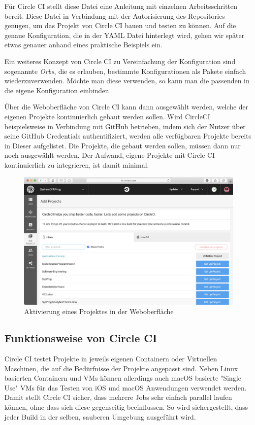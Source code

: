 \documentclass[11pt]{article}
\begin{document}
Für Circle CI stellt diese Datei eine Anleitung mit einzelnen Arbeitsschritten bereit. Diese Datei in Verbindung mit der Autorisierung des Repositories genügen, um das Projekt von Circle CI bauen und testen zu können. Auf die genaue Konfiguration, die in der YAML Datei hinterlegt wird, gehen wir später etwas genauer anhand eines praktische Beispiels ein.

Ein weiteres Konzept von Circle CI zu Vereinfachung der Konfiguration sind sogenannte \textit{Orbs}, die es erlauben, bestimmte Konfigurationen als Pakete einfach wiederzuverwenden. Möchte man diese verwenden, so kann man die passenden in die eigene Konfiguration einbinden.

Über die Weboberfläche von Circle CI kann dann ausgewählt werden, welche der eigenen Projekte kontinuierlich gebaut werden sollen. Wird CircleCI beispielsweise in Verbindung mit GitHub betrieben, indem sich der Nutzer über seine GitHub Credentials authentifiziert, werden alle verfügbaren Projekte bereits in Dieser aufgelistet. Die Projekte, die gebaut werden sollen, müssen dann nur noch ausgewählt werden. Der Aufwand, eigene Projekte mit Circle CI kontinuierlich zu integrieren, ist damit minimal.

\begin{figure}[H]
	\centering
  	\includegraphics[width=1\linewidth]{../Images/Projekt_aktivieren}
  	\caption{Aktivierung eines Projektes in der Weboberfläche}
  	\label{fig:aktivieren}
\end{figure}

\subsection{Funktionsweise von Circle CI}
Circle CI testet Projekte in jeweils eigenen Containern oder Virtuellen Maschinen, die auf die Bedürfnisse der Projekte angepasst sind. Neben Linux basierten Containern und VMs können allerdings auch macOS basierte "Single Use" VMs für das Testen von iOS und macOS Anwendungen verwendet werden. Damit stellt Circle CI sicher, dass mehrere Jobs sehr einfach parallel laufen können, ohne dass sich diese gegenseitig beeinflussen. So wird sichergestellt, dass jeder Build in der selben, sauberen Umgebung ausgeführt wird.
\end{document}
